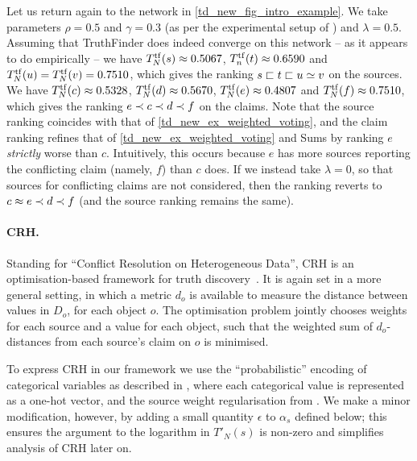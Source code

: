 Let us return again to the network in \cref{td_new_fig_intro_example}. We take
parameters $\rho = 0.5$ and $\gamma = 0.3$ (as per the experimental setup of
\textcite{yin2008}) and $\lambda = 0.5$. Assuming that TruthFinder does indeed
converge on this network -- as it appears to do empirically -- we have
$T^{\operatorname{tf}}_N(s) \approx 0.5067$, $T^{\operatorname{tf}}_n(t) \approx 0.6590$ and
$T^{\operatorname{tf}}_N(u) = T^{\operatorname{tf}}_N(v) = 0.7510$, which gives the ranking $s
\sqsubset t \sqsubset u \simeq v$ on the sources. We have $T^{\operatorname{tf}}_N(c) \approx
0.5328$, $T^{\operatorname{tf}}_N(d) \approx 0.5670$, $T^{\operatorname{tf}}_N(e) \approx 0.4807$
and $T^{\operatorname{tf}}_N(f) \approx 0.7510$, which gives the ranking $e \prec c \prec
d \prec f$ on the claims. Note that the source ranking coincides with that of
\cref{td_new_ex_weighted_voting}, and the claim ranking refines that of
\cref{td_new_ex_weighted_voting} and Sums by ranking $e$ \emph{strictly} worse
than $c$. Intuitively, this occurs because $e$ has more sources reporting the
conflicting claim (namely, $f$) than $c$ does. If we instead take $\lambda =
0$, so that sources for conflicting claims are not considered, then the ranking
reverts to $c \approx e \prec d \prec f$ (and the source ranking remains the same).

\paragraph{CRH.} Standing for ``Conflict Resolution on Heterogeneous Data'', CRH
is an optimisation-based framework for truth discovery~\cite{li2016}. It is
again set in a more general setting, in which a metric $d_o$ is available to
measure the distance between values in $D_o$, for each object $o$. The
optimisation problem jointly chooses weights for each source and a value for
each object, such that the weighted sum of $d_o$-distances from each source's
claim on $o$ is minimised.

To express CRH in our framework we use the ``probabilistic'' encoding of
categorical variables as described in \cite[]{li2016},
where each categorical value is represented as a one-hot vector, and the source
weight regularisation from \cite[Eq. (4)]{li2016}. We make a minor
modification, however, by adding a small quantity $\epsilon$ to $\alpha_s$
defined below; this ensures the argument to the logarithm in $T'_N(s)$ is
non-zero and simplifies analysis of CRH later on.

